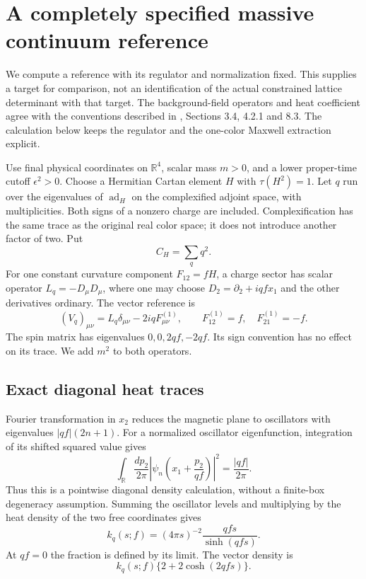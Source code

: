 \section{A completely specified massive continuum reference}
\label{mcr-section}

We compute a reference with its regulator and normalization fixed.
This supplies a target for comparison, not an identification of
the actual constrained lattice determinant with that target.
The background-field operators and heat coefficient agree with
the conventions described in \cite{vassilevichctn}, Sections 3.4,
4.2.1 and 8.3. The calculation below keeps the regulator and
the one-color Maxwell extraction explicit.

Use final physical coordinates on \(\mathbb R^4\), scalar mass
\(m>0\), and a lower proper-time cutoff \(\epsilon^2>0\).
Choose a Hermitian Cartan element \(H\) with
\(\tau(H^2)=1\). Let \(q\) run over the eigenvalues of
\(\operatorname{ad}_H\) on the complexified adjoint space,
with multiplicities. Both signs of a nonzero charge are
included. Complexification has the same trace as the
original real color space; it does not introduce another
factor of two. Put
\[
 C_H=\sum_q q^2.
\]
For one constant curvature component \(F_{12}=fH\), a charge
sector has scalar operator \(L_q=-D_\mu D_\mu\), where one
may choose \(D_2=\partial_2+iqf x_1\) and the other derivatives
ordinary. The vector reference is
\[
 (V_q)_{\mu\nu}=L_q\delta_{\mu\nu}-2iqF^{(1)}_{\mu\nu},
 \qquad F^{(1)}_{12}=f,\quad F^{(1)}_{21}=-f.
\]
The spin matrix has eigenvalues \(0,0,2qf,-2qf\).
Its sign convention has no effect on its trace.
We add \(m^2\) to both operators.

\subsection{Exact diagonal heat traces}
\label{mcr-heat-section}

Fourier transformation in \(x_2\) reduces the magnetic
plane to oscillators with eigenvalues \(|qf|(2n+1)\).
For a normalized oscillator eigenfunction, integration
of its shifted squared value gives
\[
 \int_{\mathbb R}\frac{dp_2}{2\pi}
  \left|\psi_n\!\left(x_1+\frac{p_2}{qf}\right)\right|^2
       =\frac{|qf|}{2\pi}.
\]
Thus this is a pointwise diagonal density calculation,
without a finite-box degeneracy assumption. Summing the
oscillator levels and multiplying by the heat density
of the two free coordinates gives
\begin{equation}
 k_q(s;f)=(4\pi s)^{-2}\frac{qfs}{\sinh(qfs)}.
 \label{mcr-scalar-heat}
\end{equation}
At \(qf=0\) the fraction is defined by its limit.
The vector density is
\[
 k_q(s;f)\{2+2\cosh(2qfs)\}.
\]

